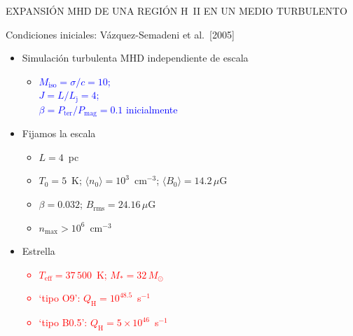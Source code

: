 \documentclass
[
]
{beamer}
\newcommand\red{\textcolor{red}}
\newcommand\darkgreen{\textcolor{green!85!black}}
\newcommand\blue{\textcolor{blue}}
\begin{document}

{
\begin{frame}[plain]
\centerline{EXPANSI\'ON MHD DE UNA REGI\'ON H~II EN UN MEDIO TURBULENTO}
\vfill
\centerline{Condiciones iniciales: V\'azquez-Semadeni et al.\ [2005]}
\vfill
\begin{itemize}
    \item<1-> Simulaci\'on turbulenta MHD independiente de escala
  \begin{itemize}
  \item<2-> \blue{  $M_\mathrm{iso} = \sigma/c = 10$; \\$J = L/L_\mathrm{j} = 4$;\\
    $\beta = P_\mathrm{ter}/P_\mathrm{mag} = 0.1$ inicialmente}
  \end{itemize}
\item<1-> Fijamos la escala
\darkgreen{    \begin{itemize}
  \item<3-> $L = 4$~pc
    \item<3-> $T_0 = 5$~K; $\langle n_0 \rangle = 10^3$~cm$^{-3}$;
    $\langle B_0 \rangle = 14.2\,\mu$G
     \item<3-> $\beta = 0.032$; $B_\mathrm{rms} = 24.16\,\mu$G
       \item<3-> $n_\mathrm{max} > 10^6$~cm$^{-3}$  
  \end{itemize} }
\item<1-> Estrella 
\red{   \begin{itemize}
   \item<4-> $T_\mathrm{eff} = 37\,500$~K; $M_* = 32\,M_\odot$
      \item<4-> `tipo O9': $Q_\mathrm{H} = 10^{48.5}$~s$^{-1}$
      \item<4-> `tipo B0.5': $Q_\mathrm{H} = 5\times10^{46}$~s$^{-1}$ 
  \end{itemize} }
\end{itemize}
\vfill
\end{frame}
}
\end{document}
